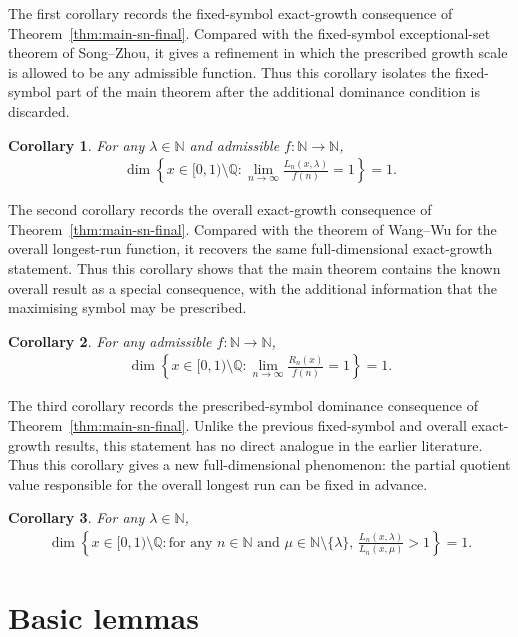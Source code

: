 \documentclass[10pt,a4paper]{amsart}
\newtheorem{coro}{Corollary}
\begin{document}
The first corollary records the fixed-symbol exact-growth consequence of Theorem~\ref{thm:main-sn-final}. Compared with the fixed-symbol exceptional-set theorem of Song--Zhou, it gives a refinement in which the prescribed growth scale is allowed to be any admissible function. Thus this corollary isolates the fixed-symbol part of the main theorem after the additional dominance condition is discarded.
\begin{coro}
\label{label:coro1}
For any $\lambda\in\mathbb{N}$ and admissible $f:\mathbb{N}\to\mathbb{N}$, 
\begin{align*}
    \dim{\left\{x\in[0,1)\setminus\mathbb{Q}:
    \lim_{n\to\infty}\frac{L_n(x,\lambda)}{f(n)}=1\right\}}=1.
\end{align*}
\end{coro}

The second corollary records the overall exact-growth consequence of Theorem~\ref{thm:main-sn-final}. Compared with the theorem of Wang--Wu for the overall longest-run function, it recovers the same full-dimensional exact-growth statement. Thus this corollary shows that the main theorem contains the known overall result as a special consequence, with the additional information that the maximising symbol may be prescribed.
\begin{coro}
\label{label:coro2}
For any admissible $f:\mathbb{N}\to\mathbb{N}$, 
\begin{align*}
    \dim{\left\{x\in[0,1)\setminus\mathbb{Q}:
    \lim_{n\to\infty}\frac{R_n(x)}{f(n)}=1\right\}}=1.
\end{align*}
\end{coro}

The third corollary records the prescribed-symbol dominance consequence of Theorem~\ref{thm:main-sn-final}. Unlike the previous fixed-symbol and overall exact-growth results, this statement has no direct analogue in the earlier literature. Thus this corollary gives a new full-dimensional phenomenon: the partial quotient value responsible for the overall longest run can be fixed in advance.
\begin{coro}
\label{label:coro3}
For any $\lambda\in\mathbb{N}$,
\begin{align*}
    \dim{\left\{x\in[0,1)\setminus\mathbb{Q}:
    \text{for any $n\in\mathbb{N}$ and $\mu\in\mathbb{N}\setminus\{\lambda\}$, }\frac{
    L_n(x,\lambda)}{L_n(x,\mu)}>1\right\}}=1.
\end{align*}
\end{coro}

\section{Basic lemmas}
\end{document}
